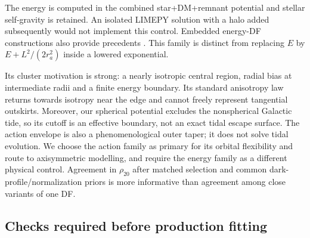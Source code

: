 \documentclass[11pt,a4paper]{article}
\begin{document}
The energy is computed in the combined star+DM+remnant potential and stellar
self-gravity is retained. An isolated LIMEPY solution with a halo added
subsequently would not implement this control. Embedded energy-DF
constructions also provide precedents
\citep{2011MNRAS.411.2118A,2012MNRAS.419..184A}. This family is distinct
from replacing $E$ by $E+L^2/(2r_a^2)$ inside a lowered exponential.

Its cluster motivation is strong: a nearly isotropic central region, radial
bias at intermediate radii and a finite energy boundary. Its standard
anisotropy law returns towards isotropy near the edge and cannot freely
represent tangential outskirts. Moreover, our spherical potential excludes
the nonspherical Galactic tide, so its cutoff is an effective boundary, not
an exact tidal escape surface. The action envelope is also a phenomenological
outer taper; it does not solve tidal evolution. We choose the action family
as primary for its orbital flexibility and route to axisymmetric modelling,
and require the energy family as a different physical control. Agreement
in $\rho_{20}$ after matched selection and common dark-profile/normalization
priors is more informative than agreement among close variants of one DF.

\subsection{Checks required before production fitting}
\end{document}
